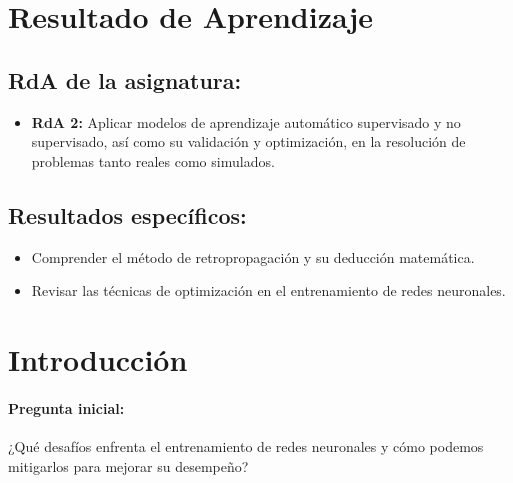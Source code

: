 \documentclass[a4,11pt]{aleph-notas}
\begin{document}
\encabezado


\section*{Resultado de Aprendizaje}

\subsection*{RdA de la asignatura:}
\begin{itemize}[leftmargin=*]
    \item \textbf{RdA 2:} 
    Aplicar modelos de aprendizaje automático supervisado y no supervisado, así como su validación y optimización, en la resolución de problemas tanto reales como simulados.
\end{itemize}

\subsection*{Resultados específicos:}  
\begin{itemize}[leftmargin=*]  
    \item Comprender el método de retropropagación y su deducción matemática.  
    \item Revisar las técnicas de optimización en el entrenamiento de redes neuronales.  
\end{itemize}  

\section*{Introducción}  

\paragraph{Pregunta inicial:}  
¿Qué desafíos enfrenta el entrenamiento de redes neuronales y cómo podemos mitigarlos para mejorar su desempeño?  
\end{document}
